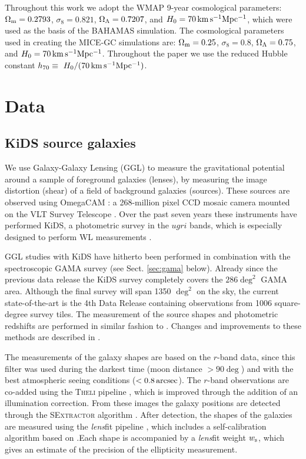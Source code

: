 \documentclass[usenatbib]{mnras}
\newcommand{\as}{\, {\rm arcsec}}
\newcommand{\un}[1]{_{\rm #1}}
\begin{document}
Throughout this work we adopt the WMAP 9-year \cite[]{hinshaw2013} cosmological parameters: $\Omega_{\rm m}=0.2793$, $\sigma_8=0.821$, $\Omega_{\rm \Lambda}=0.7207$, and $H_0 = 70 \, {\rm km \, s^{-1} Mpc^{-1}}$, which were used as the basis of the BAHAMAS simulation. The cosmological parameters used in creating the MICE-GC simulations are: $\Omega_{\rm m}=0.25$, $\sigma_8=0.8$, $\Omega_{\rm \Lambda}=0.75$, and $H_0 = 70 \, {\rm km \, s^{-1} Mpc^{-1}}$. Throughout the paper we use the reduced Hubble constant $h_{70} \equiv \ H_0 / (70 \, {\rm km \, s^{-1} Mpc^{-1}})$.

\section{Data}
\label{sec:data}

\subsection{KiDS source galaxies}
\label{sec:kids}

We use Galaxy-Galaxy Lensing (GGL) to measure the gravitational potential around a sample of foreground galaxies (lenses), by measuring the image distortion (shear) of a field of background galaxies (sources). These sources are observed using OmegaCAM \cite[]{kuijken2011}: a 268-million pixel CCD mosaic
camera mounted on the VLT Survey Telescope \cite[]{capaccioli2011}. Over the past seven years these instruments have performed KiDS, a photometric survey in the $ugri$ bands, which is especially designed to perform WL measurements \cite[]{dejong2013}.

GGL studies with KiDS have hitherto been performed in combination with the spectroscopic GAMA survey (see Sect. \ref{sec:gama} below). Already since the previous data release \cite[KiDS-DR3,][]{dejong2017} the KiDS survey completely covers the $286 \deg^2$ GAMA area. Although the final survey will span 1350 $\deg^2$ on the sky, the current state-of-the-art is the 4th Data Release \cite[KiDS-DR4,][]{kuijken2019} containing observations from 1006 square-degree survey tiles. The measurement of the source shapes and photometric redshifts are performed in similar fashion to \cite{dejong2017}. Changes and improvements to these methods are described in \cite{kuijken2019}. 

The measurements of the galaxy shapes are based on the $r$-band data, since this filter was used during the darkest time (moon distance $> 90 \deg$) and with the best atmospheric seeing conditions ($<0.8 \as$). The $r$-band observations are co-added using the {\scshape Theli} pipeline \cite[]{erben2013}, which is improved through the addition of an illumination correction. From these images the galaxy positions are detected through the {\scshape SExtractor} algorithm \cite[]{bertin1996}. After detection, the shapes of the galaxies are measured using the \emph{lens}fit pipeline \cite[]{miller2007,miller2013}, which includes a self-calibration algorithm based on \cite{fenechconti2017}.Each shape is accompanied by a \emph{lens}fit weight $w\un{s}$, which gives an estimate of the precision of the ellipticity measurement.
\end{document}
